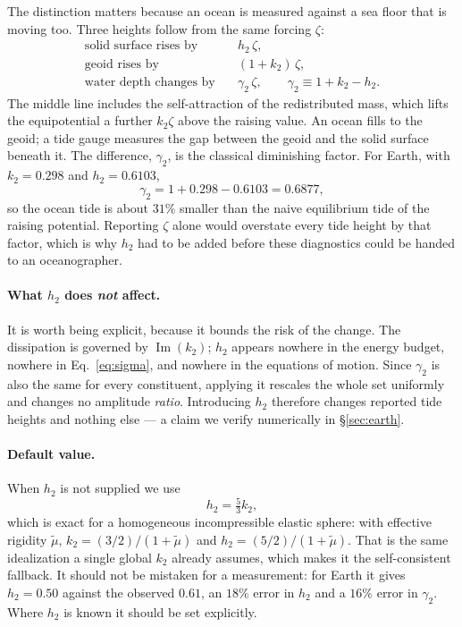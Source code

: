 \documentclass[11pt]{article}
\begin{document}
The distinction matters because an ocean is measured against a sea floor that
is moving too. Three heights follow from the same forcing $\zeta$:
\begin{align}
  \text{solid surface rises by} \quad & h_2\,\zeta, \\
  \text{geoid rises by} \quad & (1+k_2)\,\zeta, \\
  \text{water depth changes by} \quad & \gamma_2\,\zeta,
  \qquad \gamma_2 \equiv 1 + k_2 - h_2 .
  \label{eq:gamma}
\end{align}
The middle line includes the self-attraction of the redistributed mass, which
lifts the equipotential a further $k_2\zeta$ above the raising value. An ocean
fills to the geoid; a tide gauge measures the gap between the geoid and the
solid surface beneath it. The difference, $\gamma_2$, is the classical
diminishing factor. For Earth, with $k_2 = 0.298$ and $h_2 = 0.6103$,
\begin{equation}
  \gamma_2 = 1 + 0.298 - 0.6103 = 0.6877,
\end{equation}
so the ocean tide is about $31\%$ smaller than the naive equilibrium tide of
the raising potential. Reporting $\zeta$ alone would overstate every tide
height by that factor, which is why $h_2$ had to be added before these
diagnostics could be handed to an oceanographer.

\paragraph{What $h_2$ does \emph{not} affect.} It is worth being explicit,
because it bounds the risk of the change. The dissipation is governed by
$\operatorname{Im}(k_2)$; $h_2$ appears nowhere in the energy budget, nowhere
in Eq.~\eqref{eq:sigma}, and nowhere in the equations of motion. Since
$\gamma_2$ is also the same for every constituent, applying it rescales the
whole set uniformly and changes no amplitude \emph{ratio}. Introducing $h_2$
therefore changes reported tide heights and nothing else --- a claim we verify
numerically in \S\ref{sec:earth}.

\paragraph{Default value.} When $h_2$ is not supplied we use
\begin{equation}
  h_2 = \tfrac53 k_2,
\end{equation}
which is exact for a homogeneous incompressible elastic sphere: with effective
rigidity $\tilde\mu$, $k_2 = (3/2)/(1+\tilde\mu)$ and
$h_2 = (5/2)/(1+\tilde\mu)$. That is the same idealization a single global
$k_2$ already assumes, which makes it the self-consistent fallback. It should
not be mistaken for a measurement: for Earth it gives $h_2 = 0.50$ against the
observed $0.61$, an $18\%$ error in $h_2$ and a $16\%$ error in $\gamma_2$.
Where $h_2$ is known it should be set explicitly.
\end{document}
